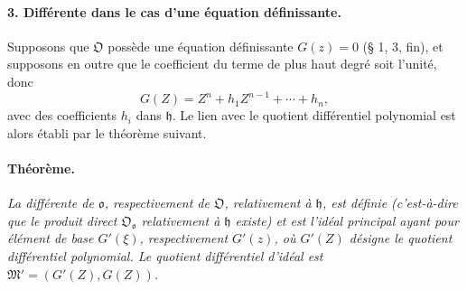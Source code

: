 \paragraph{3. Différente dans le cas d'une équation définissante.}
Supposons que \(\mathfrak O\) possède une équation définissante \(G(z)=0\) (\S{} 1, 3, fin), et supposons en outre que le coefficient du terme de plus haut degré soit l'unité, donc
\[
G(Z)=Z^n+h_1Z^{n-1}+\cdots+h_n,
\]
avec des coefficients \(h_i\) dans \(\mathfrak h\). Le lien avec le quotient différentiel polynomial est alors établi par le théorème suivant.

\paragraph{Théorème.}
\emph{La différente de \(\mathfrak o\), respectivement de \(\mathfrak O\), relativement à \(\mathfrak h\), est définie (c'est-à-dire que le produit direct \(\mathfrak O_{\mathfrak o}\) relativement à \(\mathfrak h\) existe) et est l'idéal principal ayant pour élément de base \(G'(\xi)\), respectivement \(G'(z)\), où \(G'(Z)\) désigne le quotient différentiel polynomial. Le quotient différentiel d'idéal est \(\mathfrak M'=(G'(Z),G(Z))\).}

